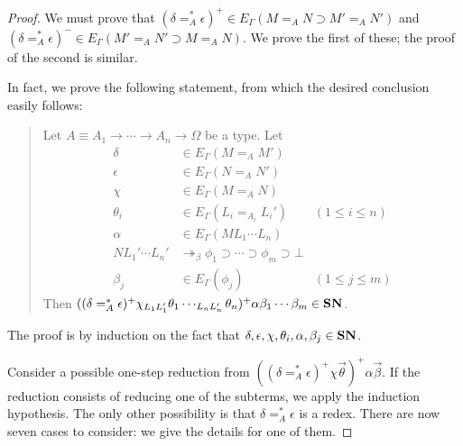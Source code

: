 \begin{proof}
We must prove that $(\delta =_A^* \epsilon)^+ \in E_\Gamma(M =_A N \supset M' =_A N')$ and
$(\delta =_A^* \epsilon)^- \in E_\Gamma(M' =_A N' \supset M =_A N)$.  We prove the first of these; the proof of the second is similar.

In fact, we prove the following statement, from which the desired conclusion easily follows:

\begin{quote}
Let $A \equiv A_1 \rightarrow \cdots \rightarrow A_n \rightarrow \Omega$ be a type.  Let
\begin{align*}
\delta & \in E_\Gamma(M =_A M') \\
\epsilon & \in E_\Gamma(N =_A N') \\
\chi & \in E_\Gamma(M =_A N) \\
\theta_i & \in E_\Gamma(L_i =_{A_i} L_i') & (1 \leq i \leq n) \\
\alpha & \in E_\Gamma(M L_1 \cdots L_n) \\
N L_1' \cdots L_n' & \twoheadrightarrow_\beta \phi_1 \supset \cdots \supset \phi_m \supset \bot \\
\beta_j & \in E_\Gamma(\phi_j) & (1 \leq j \leq m)
\end{align*}
Then $((\delta =_A^* \epsilon)^+ \chi_{L_1 L_1'} \theta_1 \cdots_{L_n L_n'} \theta_n)^+ \alpha \beta_1 \cdots \beta_m \in \mathbf{SN}$.
\end{quote}

The proof is by induction on the fact that $\delta, \epsilon, \chi, \theta_i, \alpha, \beta_j \in \mathbf{SN}$.

Consider a possible one-step reduction from $((\delta =_A^* \epsilon)^+ \chi \vec{\theta})^+ \alpha \vec{\beta}$.  If the reduction consists of reducing one of the subterms, we apply the induction hypothesis.  The only other possibility is that $\delta =_A^* \epsilon$ is a redex.  There are now seven cases to consider: we give the details for one of them.


\end{proof}
